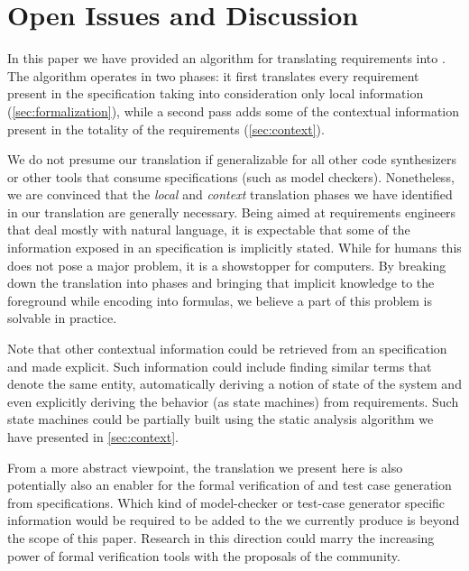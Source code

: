 \section{Open Issues and Discussion}

In this paper we have provided an algorithm for translating \ears requirements
into \ltl. The algorithm operates in two phases: it first translates every \ears
requirement present in the specification taking into consideration only local
information (\sect\ref{sec:formalization}), while a second pass adds some of the
contextual information present in the totality of the requirements
(\sect\ref{sec:context}).

We do not presume our translation if generalizable for all other code
synthesizers or other tools that consume \ltl specifications (such as model
checkers). Nonetheless, we are convinced that the \emph{local} and
\emph{context} translation phases we have identified in our translation are
generally necessary. Being aimed at requirements engineers that deal
mostly with natural language, it is expectable that some of the information
exposed in an \ears specification is implicitly stated. While for humans this does not pose a major
problem, it is a showstopper for computers. By breaking down the translation
into phases and bringing that implicit knowledge to the foreground while
encoding into \ltl formulas, we believe a part of this problem is solvable in
practice.

Note that other contextual information could be retrieved from an \ears
specification and made explicit. Such information could include \eg finding
similar terms that denote the same entity, automatically deriving a notion of
state of the system and even explicitly deriving the behavior (\eg as state
machines) from \ears requirements. Such state machines could \eg be partially
built using the static analysis algorithm we have presented in
\sect\ref{sec:context}.

From a more abstract viewpoint, the translation we present here is also
potentially also an enabler for the formal verification of and test case
generation from \ears specifications. Which kind of model-checker or test-case
generator specific information would be required to be added to the \ltl we
currently produce is beyond the scope of this paper. Research in this direction
could marry the increasing power of formal verification tools with the
proposals of the \ears community.


